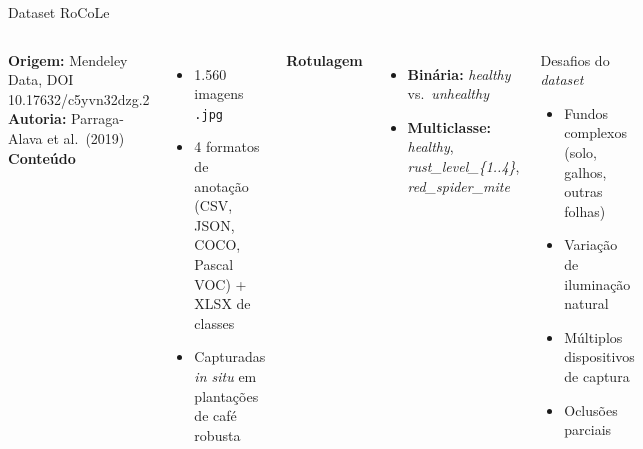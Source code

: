 \documentclass[aspectratio=169,10pt]{beamer}
\begin{document}
\begin{frame}{Dataset RoCoLe}
  \begin{columns}[T]
    \textbf{Origem:} Mendeley Data, DOI 10.17632/c5yvn32dzg.2 \\
    \textbf{Autoria:} Parraga-Alava et al.\ (2019) \\[0.3em]
    \textbf{Conteúdo}
    \begin{itemize}
      \item 1.560 imagens \texttt{.jpg}
      \item 4 formatos de anotação (CSV, JSON, COCO, Pascal VOC) + XLSX de classes
      \item Capturadas \textit{in situ} em plantações de café robusta
    \end{itemize}

    \vspace{0.4em}
    \textbf{Rotulagem}
    \begin{itemize}
      \item \textbf{Binária:} \textit{healthy} vs.\ \textit{unhealthy}
      \item \textbf{Multiclasse:} \textit{healthy}, \textit{rust\_level\_\{1..4\}}, \textit{red\_spider\_mite}
    \end{itemize}

    \begin{block}{Desafios do \textit{dataset}}
      \begin{itemize}
        \item Fundos complexos (solo, galhos, outras folhas)
        \item Variação de iluminação natural
        \item Múltiplos dispositivos de captura
        \item Oclusões parciais
      \end{itemize}
    \end{block}
  \end{columns}
\end{frame}
\end{document}
